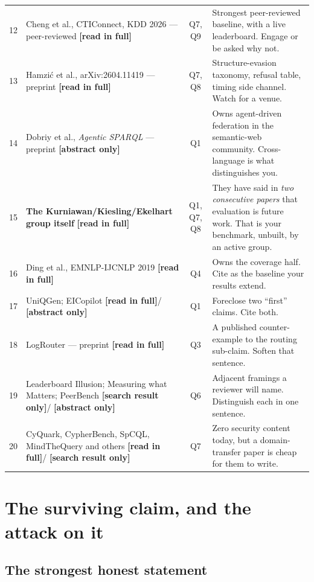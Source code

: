 \documentclass[11pt,a4paper]{article}
\newcommand{\readtag}{\textcolor{standing}{\textbf{[read in full]}}}
\newcommand{\abstag}{\textcolor{partial}{\textbf{[abstract only]}}}
\newcommand{\sniptag}{\textcolor{killed}{\textbf{[search result only]}}}
\begin{document}
\begin{center}
\begin{longtable}{@{}c>{\RaggedRight}p{5.6cm}c>{\RaggedRight}p{6.4cm}@{}}
12 & Cheng et al., CTIConnect, KDD 2026 --- peer-reviewed \readtag & Q7, Q9 & Strongest peer-reviewed baseline, with a live leaderboard. Engage or be asked why not. \\
13 & Hamzić et al., arXiv:2604.11419 --- preprint \readtag & Q7, Q8 & Structure-evasion taxonomy, refusal table, timing side channel. Watch for a venue. \\
14 & Dobriy et al., \emph{Agentic SPARQL} --- preprint \abstag & Q1 & Owns agent-driven federation in the semantic-web community. Cross-language is what distinguishes you. \\
15 & \textbf{The Kurniawan/Kiesling/Ekelhart group itself} \readtag & Q1, Q7, Q8 & They have said in \emph{two consecutive papers} that evaluation is future work. That is your benchmark, unbuilt, by an active group. \\
16 & Ding et al., EMNLP-IJCNLP 2019 \readtag & Q4 & Owns the coverage half. Cite as the baseline your results extend. \\
17 & UniQGen; EICopilot \readtag / \abstag & Q1 & Foreclose two ``first'' claims. Cite both. \\
18 & LogRouter --- preprint \readtag & Q3 & A published counter-example to the routing sub-claim. Soften that sentence. \\
19 & Leaderboard Illusion; Measuring what Matters; PeerBench \sniptag / \abstag & Q6 & Adjacent framings a reviewer will name. Distinguish each in one sentence. \\
20 & CyQuark, CypherBench, SpCQL, MindTheQuery and others \readtag / \sniptag & Q7 & Zero security content today, but a domain-transfer paper is cheap for them to write. \\
\bottomrule
\end{longtable}
\end{center}

\newpage
\section{The surviving claim, and the attack on it}

\subsection{The strongest honest statement}
\end{document}
